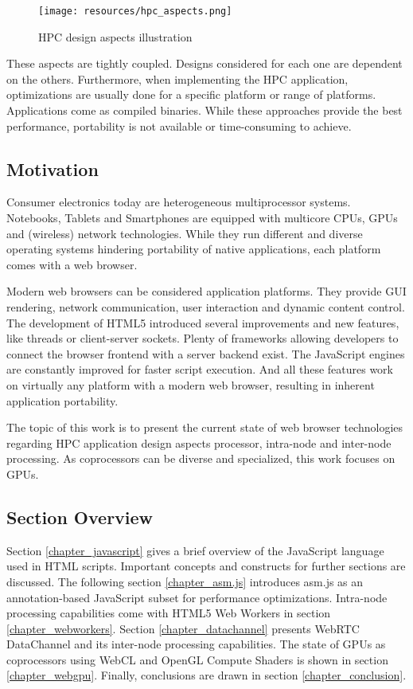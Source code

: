 \begin{figure}[htp]
  \begin{center}
    \texttt{[image: resources/hpc\_aspects.png]}
  \end{center}
  \caption{HPC design aspects illustration}
  \label{fig:hpcaspects}
\end{figure}

These aspects are tightly coupled. Designs considered for each one are dependent on the others. Furthermore, when implementing the HPC application, optimizations are usually done for a specific platform or range of platforms. Applications come as compiled binaries. While these approaches provide the best performance, portability is not available or time-consuming to achieve.


\subsection{Motivation}

Consumer electronics today are heterogeneous multiprocessor systems. Notebooks, Tablets and Smartphones are equipped with multicore CPUs, GPUs and (wireless) network technologies. While they run different and diverse operating systems hindering portability of native applications, each platform comes with a web browser.

Modern web browsers can be considered application platforms. They provide GUI rendering, network communication, user interaction and dynamic content control. The development of HTML5 introduced several improvements and new features, like threads or client-server sockets. Plenty of frameworks allowing developers to connect the browser frontend with a server backend exist. The JavaScript engines are constantly improved for faster script execution. And all these features work on virtually any platform with a modern web browser, resulting in inherent application portability.

The topic of this work is to present the current state of web browser technologies regarding HPC application design aspects processor, intra-node and inter-node processing. As coprocessors can be diverse and specialized, this work focuses on GPUs.


\subsection{Section Overview}

Section \ref{chapter_javascript} gives a brief overview of the JavaScript language used in HTML scripts. Important concepts and constructs for further sections are discussed. The following section \ref{chapter_asm.js} introduces asm.js as an annotation-based JavaScript subset for performance optimizations. Intra-node processing capabilities come with HTML5 Web Workers in section \ref{chapter_webworkers}. Section \ref{chapter_datachannel} presents WebRTC DataChannel and its inter-node processing capabilities. The state of GPUs as coprocessors using WebCL and OpenGL Compute Shaders is shown in section \ref{chapter_webgpu}. Finally, conclusions are drawn in section \ref{chapter_conclusion}.
